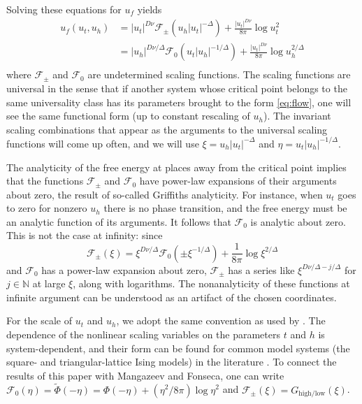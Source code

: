 \documentclass[
aps,
pre,
preprint,
longbibliography,
floatfix
]{revtex4-2}
\begin{document}
Solving these equations for $u_f$ yields
\begin{equation}
  \begin{aligned}
    u_f(u_t, u_h)
    &=|u_t|^{D\nu}\mathcal F_\pm(u_h|u_t|^{-\Delta})+\frac{|u_t|^{D\nu}}{8\pi}\log u_t^2 \\
    &=|u_h|^{D\nu/\Delta}\mathcal F_0(u_t|u_h|^{-1/\Delta})+\frac{|u_t|^{D\nu}}{8\pi}\log u_h^{2/\Delta} \\
  \end{aligned}
\end{equation}
where $\mathcal F_\pm$ and $\mathcal F_0$ are undetermined scaling functions.
The scaling functions are universal in the sense that if another system whose
critical point belongs to the same universality class has its parameters
brought to the form \eqref{eq:flow}, one will see the same functional form (up
to constant rescaling of $u_h$). The invariant scaling combinations that appear
as the arguments to the universal scaling functions will come up often, and we
will use $\xi=u_h|u_t|^{-\Delta}$ and $\eta=u_t|u_h|^{-1/\Delta}$.

The analyticity of the free energy at places away from the critical point
implies that the functions $\mathcal F_\pm$ and $\mathcal F_0$ have power-law
expansions of their arguments about zero, the result of so-called Griffiths
analyticity. For instance, when $u_t$ goes to zero for nonzero $u_h$ there is
no phase transition, and the free energy must be an analytic function of its
arguments. It follows that $\mathcal F_0$ is analytic about zero. This is not
the case at infinity: since
\begin{equation}
  \mathcal F_\pm(\xi)
  =\xi^{D\nu/\Delta}\mathcal F_0(\pm \xi^{-1/\Delta})+\frac1{8\pi}\log\xi^{2/\Delta}
\end{equation}
and $\mathcal F_0$ has a power-law expansion about zero, $\mathcal
F_\pm$ has a series like $\xi^{D\nu/\Delta-j/\Delta}$ for $j\in\mathbb N$ at
large $\xi$, along with logarithms. The nonanalyticity of these functions at
infinite argument can be understood as an artifact of the chosen coordinates.

For the scale of $u_t$ and $u_h$, we adopt the same convention as used by
\cite{Fonseca_2003_Ising}. The dependence of the nonlinear scaling variables on
the parameters $t$ and $h$ is system-dependent, and their form can be found for
common model systems (the square- and triangular-lattice Ising models) in the
literature \cite{Mangazeev_2010_Scaling, Clement_2019_Respect}.  To connect the
results of this paper with Mangazeev and Fonseca, one can write $\mathcal
F_0(\eta)=\tilde\Phi(-\eta)=\Phi(-\eta)+(\eta^2/8\pi) \log \eta^2$ and
$\mathcal F_\pm(\xi)=G_{\mathrm{high}/\mathrm{low}}(\xi)$.
\end{document}
